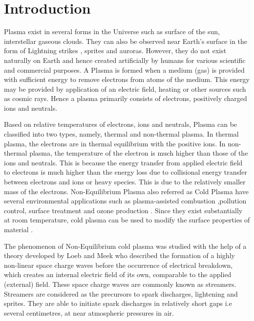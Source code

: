 \documentclass{article}
\begin{document}

\justifying

\section{Introduction}

Plasma exist in several forms in the Universe such as surface of the sun, interstellar gaseous clouds. They can also be observed near Earth's surface in the form of Lightning strikes \cite{Bazelyan2000TheLasers} \cite{Raizer1991GasRazryada}, sprites \cite{Bourdon2007EfficientEquations} \cite{Franz1990TelevisionSystem} and auroras. However, they do not exist naturally on Earth and hence created artificially by humans for various scientific and commercial purposes. A Plasma is formed when a medium (gas) is provided with sufficient energy to remove electrons from atoms of the medium. This energy may be provided by application of an electric field, heating or other sources such as cosmic rays. Hence a plasma primarily consists of electrons, positively charged ions and neutrals.

Based on relative temperatures of electrons, ions and neutrals, Plasma can be classified into two types, namely, thermal and non-thermal plasma. In thermal plasma, the electrons are in thermal equilibrium with the positive ions. In non-thermal plasma, the temperature of the electron is much higher than those of the ions and neutrals. This is because the energy transfer from applied electric field to electrons is much higher than the energy loss due to collisional energy transfer between electrons and ions or heavy species. This is due to the relatively smaller mass of the electrons. Non-Equilibrium Plasma also referred as Cold Plasma have several environmental applications such as plasma-assisted combustion \cite{Starikovskaia2006PlasmaCombustion} \cite{Popov2016KineticsMixtures},pollution control, surface treatment \cite{Kogelschatz2002FilamentaryDischarges}  and ozone production \cite{Eliasson1991ModelingPlasmas}. Since they exist substantially at room temperature, cold plasma can be used to modify the surface properties of material \cite{Bonizzoni2002PlasmaApplications}.

The phenomenon of Non-Equilibrium cold plasma was studied with the help of a theory developed by Loeb and Meek \cite{Loeb1929THEPRESSURE} who described the formation of a highly non-linear space charge waves before the occurrence of electrical breakdown, which creates an internal electric field of its own, comparable to the applied (external) field. These space charge waves are commonly known as streamers. Streamers are considered as the precursors to spark discharges, lightening and sprites. They are able to initiate spark discharges in relatively short gaps i.e several centimetres, at near atmospheric pressures in air.  
\end{document}
